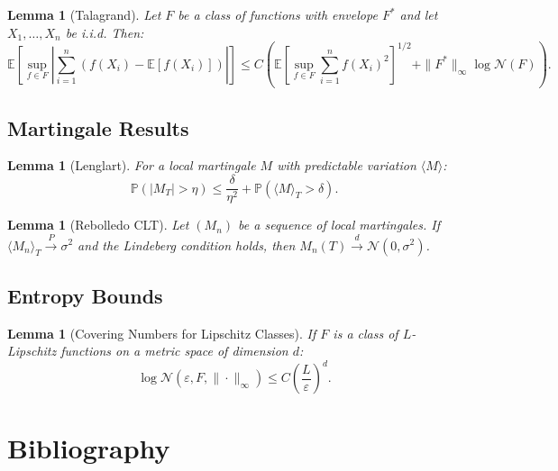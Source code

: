 \documentclass[11pt,twoside,openright]{book}
\theoremstyle{plain}
\newtheorem{lemma}[theorem]{Lemma}
\theoremstyle{definition}
\theoremstyle{remark}
\newcommand{\calN}{\mathcal{N}}
\newcommand{\norm}[1]{\|#1\|}
\newcommand{\abs}[1]{|#1|}
\newcommand{\E}{\mathbb{E}}
\newcommand{\Prob}{\mathbb{P}}
\begin{document}
\begin{lemma}[Talagrand]
Let $F$ be a class of functions with envelope $F^*$ and let $X_1, \ldots, X_n$ be i.i.d. Then:
\[
\E\left[\sup_{f \in F} \abs{\sum_{i=1}^n (f(X_i) - \E[f(X_i)])}\right] \leq C\left(\E\left[\sup_{f \in F} \sum_{i=1}^n f(X_i)^2\right]^{1/2} + \norm{F^*}_\infty \log \calN(F)\right).
\]
\end{lemma}

\section{Martingale Results}

\begin{lemma}[Lenglart]
For a local martingale $M$ with predictable variation $\langle M \rangle$:
\[
\Prob(\abs{M_T} > \eta) \leq \frac{\delta}{\eta^2} + \Prob(\langle M \rangle_T > \delta).
\]
\end{lemma}

\begin{lemma}[Rebolledo CLT]
Let $(M_n)$ be a sequence of local martingales. If $\langle M_n \rangle_T \xrightarrow{P} \sigma^2$ and the Lindeberg condition holds, then $M_n(T) \xrightarrow{d} \calN(0, \sigma^2)$.
\end{lemma}

\section{Entropy Bounds}

\begin{lemma}[Covering Numbers for Lipschitz Classes]
If $F$ is a class of $L$-Lipschitz functions on a metric space of dimension $d$:
\[
\log \calN(\varepsilon, F, \norm{\cdot}_\infty) \leq C \left(\frac{L}{\varepsilon}\right)^d.
\]
\end{lemma}


\chapter{Bibliography}
\end{document}

